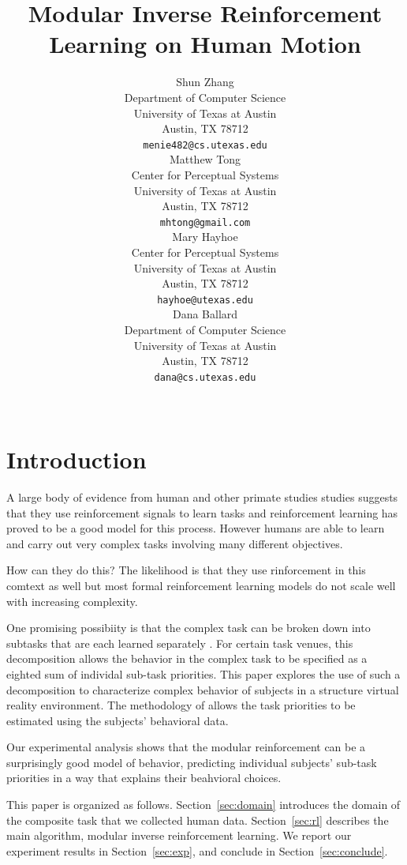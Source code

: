 \documentclass[11pt]{article} %
\title{Modular Inverse Reinforcement Learning on Human Motion}
\author{
Shun Zhang\\
Department of Computer Science\\
University of Texas at Austin\\
Austin, TX 78712 \\
\texttt{menie482@cs.utexas.edu} \\
\And
Matthew Tong \\
Center for Perceptual Systems\\
University of Texas at Austin\\
Austin, TX 78712 \\
\texttt{mhtong@gmail.com} \\
\AND
Mary Hayhoe \\
Center for Perceptual Systems\\
University of Texas at Austin\\
Austin, TX 78712 \\
\texttt{hayhoe@utexas.edu} \\
\And
Dana Ballard \\
Department of Computer Science\\
University of Texas at Austin\\
Austin, TX 78712 \\
\texttt{dana@cs.utexas.edu} \\
\\
}
\begin{document}
\maketitle

\begin{abstract}
\end{abstract}


\startmain %

\section{Introduction}

A large body of evidence from human and other primate studies studies 
suggests that they use reinforcement signals to learn tasks and reinforcement 
learning has proved to be a good model for this process.
However humans are able to learn and carry out very complex tasks involving 
many different objectives. 

How can they do this? The likelihood is that they use rinforcement in this 
comtext as well but most formal reinforcement learning models do not scale 
well with increasing complexity.

One promising possibiity is that the complex task can be broken down into 
subtasks that are each learned separately \cite{sprague2003multiple,
rothkopf2013modular}. 
For certain task venues, this decomposition allows the behavior in the complex 
task to be specified as a eighted sum of individal sub-task priorities.
This paper explores the use of such a decomposition to characterize complex 
behavior of subjects in a structure virtual reality environment. The 
methodology of \cite{rothkopf2013modular} allows the task priorities to be
estimated using the subjects' behavioral data.

Our experimental analysis shows that the modular reinforcement can be a 
surprisingly good model of behavior, predicting individual subjects' sub-task 
priorities in a way that explains their beahvioral choices.

This paper is organized as follows. Section~\ref{sec:domain} introduces the
domain of the composite task that we collected human data. Section~\ref{sec:rl}
describes the main algorithm, modular inverse reinforcement learning. We report
our experiment results in Section~\ref{sec:exp}, and conclude in
Section~\ref{sec:conclude}.
\end{document}
